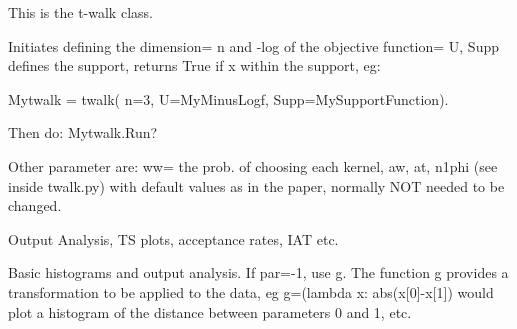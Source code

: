 \documentclass[letterpaper,10pt,english]{sphinxmanual}
\begin{document}
\begin{fulllineitems}
\label{api/pytwalk:refl1d.pytwalk.pytwalk}
This is the t-walk class.

Initiates defining the dimension= n and -log of the objective function= U,
Supp defines the support, returns True if x within the support, eg:

Mytwalk = twalk( n=3, U=MyMinusLogf, Supp=MySupportFunction).

Then do: Mytwalk.Run?

Other parameter are:
ww= the prob. of choosing each kernel, aw, at, n1phi (see inside twalk.py)
with default values as in the paper, normally NOT needed to be changed.

\begin{fulllineitems}
\label{api/pytwalk:refl1d.pytwalk.pytwalk.Ana}
Output Analysis, TS plots, acceptance rates, IAT etc.

\end{fulllineitems}


\begin{fulllineitems}
\label{api/pytwalk:refl1d.pytwalk.pytwalk.GBlowU}
\end{fulllineitems}


\begin{fulllineitems}
\label{api/pytwalk:refl1d.pytwalk.pytwalk.GHopU}
\end{fulllineitems}


\begin{fulllineitems}
\label{api/pytwalk:refl1d.pytwalk.pytwalk.Hist}
Basic histograms and output analysis.  If par=-1, use g.
The function g provides a transformation to be applied to the data,
eg g=(lambda x: abs(x{[}0{]}-x{[}1{]}) would plot a histogram of the distance
between parameters 0 and 1, etc.


\end{fulllineitems}
\end{fulllineitems}
\end{document}
